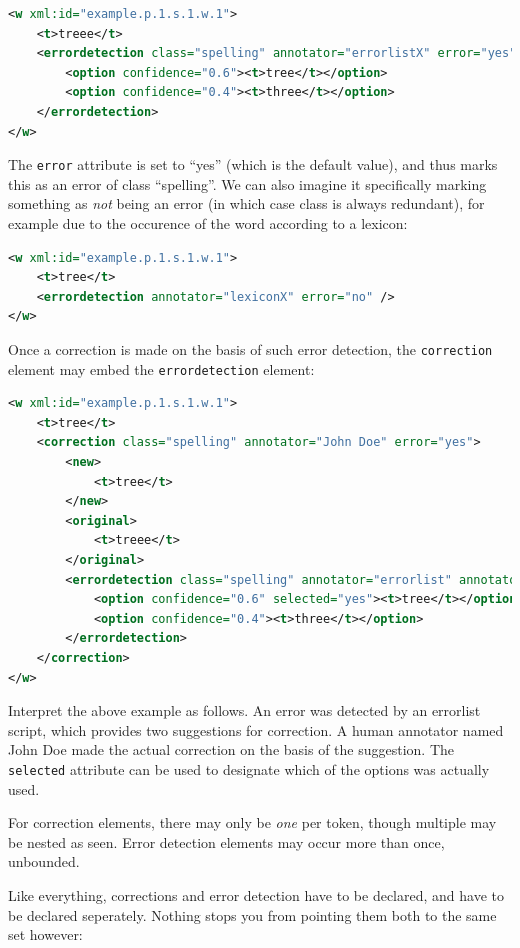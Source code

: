 \documentclass[a4paper,12pt]{report}
\begin{document}
\begin{lstlisting}[language=xml]
<w xml:id="example.p.1.s.1.w.1">
    <t>treee</t>
    <errordetection class="spelling" annotator="errorlistX" error="yes">
        <option confidence="0.6"><t>tree</t></option>
        <option confidence="0.4"><t>three</t></option>
    </errordetection>
</w>    
\end{lstlisting}


The \texttt{error} attribute is set to ``yes'' (which is the default value), and thus marks this as an error of class ``spelling''. We can also imagine it specifically marking something as \emph{not} being an error (in which case class is always redundant), for example due to the occurence of the word according to a lexicon:

\begin{lstlisting}[language=xml]
<w xml:id="example.p.1.s.1.w.1">
    <t>tree</t>
    <errordetection annotator="lexiconX" error="no" />
</w>    
\end{lstlisting}

Once a correction is made on the basis of such error detection, the \texttt{correction} element may embed the \texttt{errordetection} element:

\begin{lstlisting}[language=xml]
<w xml:id="example.p.1.s.1.w.1">
    <t>tree</t>
    <correction class="spelling" annotator="John Doe" error="yes">
        <new>
            <t>tree</t>
        </new>
        <original>
            <t>treee</t>
        </original>
        <errordetection class="spelling" annotator="errorlist" annotatortype="auto" error="yes">
            <option confidence="0.6" selected="yes"><t>tree</t></option>
            <option confidence="0.4"><t>three</t></option>
        </errordetection>            
    </correction>
</w>    
\end{lstlisting}

Interpret the above example as follows. An error was detected by an errorlist script, which provides two suggestions for correction. A human annotator named John Doe made the actual correction on the basis of the suggestion. The \texttt{selected} attribute can be used to designate which of the options was actually used.

For correction elements, there may only be \emph{one} per token, though multiple may be nested as seen. Error detection elements may occur more than once, unbounded.

Like everything, corrections and error detection have to be declared, and have to be declared seperately. Nothing stops you from pointing them both to the same set however:
\end{document}
